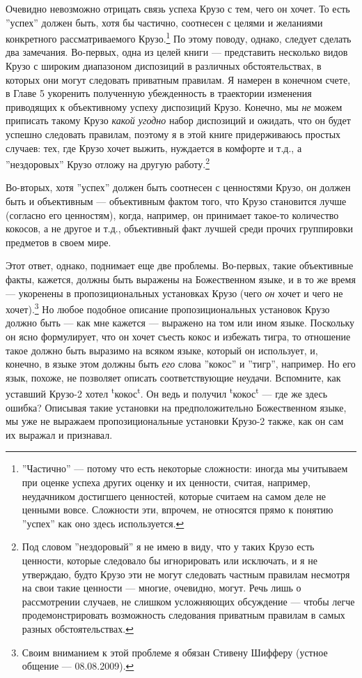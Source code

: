 \documentclass[11pt]{book}
\begin{document}
Очевидно невозможно отрицать связь успеха Крузо с тем, чего он хочет. То есть ''успех'' должен быть, хотя бы частично, соотнесен с целями и желаниями конкретного рассматриваемого Крузо.\footnote{''Частично'' --- потому что есть некоторые сложности: иногда мы учитываем при оценке успеха других оценку и их ценности, считая, например, неудачником достигшего ценностей, которые считаем на самом деле не ценными вовсе. Сложности эти, впрочем, не относятся прямо к понятию ''успех'' как оно здесь используется.} По этому поводу, однако, следует сделать два замечания. Во-первых, одна из целей книги --- представить несколько видов Крузо с широким диапазоном диспозиций в различных обстоятельствах, в которых они могут следовать приватным правилам. Я намерен в конечном счете, в Главе 5 укоренить полученную убежденность в траектории изменения приводящих к объективному успеху диспозиций Крузо. Конечно, мы \textit{не} можем приписать такому Крузо \textit{какой угодно} набор диспозиций и ожидать, что он будет успешно следовать правилам, поэтому я в этой книге придерживаюсь простых случаев: тех, где Крузо хочет выжить, нуждается в комфорте и т.д., а ''нездоровых'' Крузо отложу на другую работу.\footnote{Под словом ''нездоровый'' я не имею в виду, что у таких Крузо есть ценности, которые следовало бы игнорировать или исключать, и я не утверждаю, будто Крузо эти не могут следовать частным правилам несмотря на свои такие ценности --- многие, очевидно, могут. Речь лишь о рассмотрении случаев, не слишком усложняющих обсуждение --- чтобы легче продемонстрировать возможность следования приватным правилам в самых разных обстоятельствах.}

Во-вторых, хотя ''успех'' должен быть соотнесен с ценностями Крузо, он должен быть и объективным --- объективным фактом того, что Крузо становится лучше (согласно его ценностям), когда, например, он принимает такое-то количество кокосов, а не другое и т.д., объективный факт лучшей среди прочих группировки предметов в своем мире.

Этот ответ, однако, поднимает еще две проблемы. Во-первых, такие объективные факты, кажется, должны быть выражены на Божественном языке, и в то же время --- укоренены в пропозициональных установках Крузо (чего \textit{он} хочет и чего не хочет).\footnote{Своим вниманием к этой проблеме я обязан Стивену Шифферу (устное общение --- 08.08.2009).} Но любое подобное описание пропозициональных установок Крузо должно быть --- как мне кажется --- выражено на том или ином языке. Поскольку он ясно формулирует, что он хочет съесть кокос и избежать тигра, то отношение такое должно быть выразимо на всяком языке, который он использует, и, конечно, в языке этом должны быть \textit{его} слова ''кокос'' и ''тигр'', например. Но его язык, похоже, не позволяет описать соответствующие неудачи. Вспомните, как уставший Крузо-2 хотел \textsuperscript{t}кокос\textsuperscript{t}. Он ведь и получил \textsuperscript{t}кокос\textsuperscript{t} --- где же здесь ошибка? Описывая такие установки на предположительно Божественном языке, мы уже не выражаем пропозициональные установки Крузо-2 также, как он сам их выражал и признавал.
\end{document}

